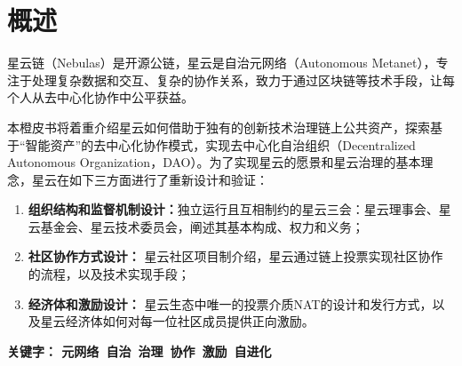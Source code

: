 \section{概述}

星云链（Nebulas）是开源公链，星云是自治元网络（Autonomous Metanet），专注于处理复杂数据和交互、复杂的协作关系，致力于通过区块链等技术手段，让每个人从去中心化协作中公平获益。

本橙皮书将着重介绍星云如何借助于独有的创新技术治理链上公共资产，探索基于“智能资产”的去中心化协作模式，实现去中心化自治组织（Decentralized Autonomous Organization，DAO）。为了实现星云的愿景和星云治理的基本理念，星云在如下三方面进行了重新设计和验证：


\begin{enumerate}
	\item \textbf{组织结构和监督机制设计：}独立运行且互相制约的星云三会：星云理事会、星云基金会、星云技术委员会，阐述其基本构成、权力和义务；
	\item \textbf{社区协作方式设计：}
	星云社区项目制介绍，星云通过链上投票实现社区协作的流程，以及技术实现手段；
	\item \textbf{经济体和激励设计：}
	星云生态中唯一的投票介质NAT的设计和发行方式，以及星云经济体如何对每一位社区成员提供正向激励。
\end{enumerate}

\textbf{关键字： 元网络\ 自治\ 治理\ 协作\ 激励\ 自进化 }